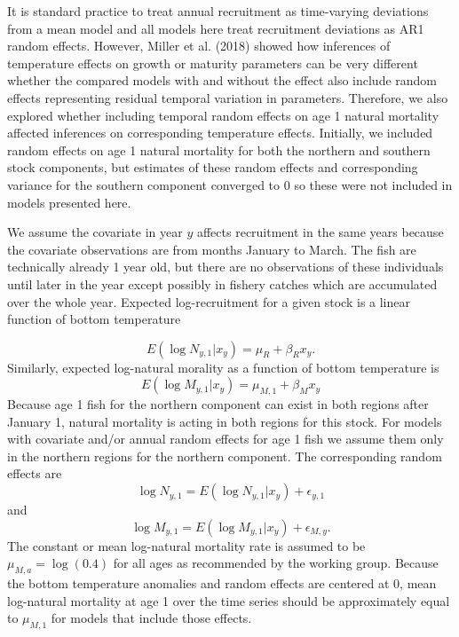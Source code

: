 \documentclass[
]{article}
\begin{document}
It is standard practice to treat annual recruitment as time-varying
deviations from a mean model and all models here treat recruitment
deviations as AR1 random effects. However, Miller et al. (2018) showed
how inferences of temperature effects on growth or maturity parameters
can be very different whether the compared models with and without the
effect also include random effects representing residual temporal
variation in parameters. Therefore, we also explored whether including
temporal random effects on age 1 natural mortality affected inferences
on corresponding temperature effects. Initially, we included random
effects on age 1 natural mortality for both the northern and southern
stock components, but estimates of these random effects and
corresponding variance for the southern component converged to 0 so
these were not included in models presented here.

We assume the covariate in year \(y\) affects recruitment in the same
years because the covariate observations are from months January to
March. The fish are technically already 1 year old, but there are no
observations of these individuals until later in the year except
possibly in fishery catches which are accumulated over the whole year.
Expected log-recruitment for a given stock is a linear function of
bottom temperature

\begin{equation}\label{eq:expected-recruitment}
E\left(\log N_{y,1}|x_y\right) = \mu_{R} + \beta_{R} x_y.
\end{equation} Similarly, expected log-natural morality as a function of
bottom temperature is \begin{equation}\label{eq:expected-M1}
E\left(\log M_{y,1}|x_y\right) = \mu_{M,1} + \beta_{M} x_y
\end{equation} Because age 1 fish for the northern component can exist
in both regions after January 1, natural mortality is acting in both
regions for this stock. For models with covariate and/or annual random
effects for age 1 fish we assume them only in the northern regions for
the northern component. The corresponding random effects are
\begin{equation}\label{eq:Rec-re}
\log N_{y,1} = E\left(\log N_{y,1}|x_y\right) + \epsilon_{y,1}
\end{equation} and \begin{equation}\label{eq:M-re}
\log M_{y,1} = E\left(\log M_{y,1}|x_y\right) + \epsilon_{M,y}.
\end{equation} The constant or mean log-natural mortality rate is
assumed to be \(\mu_{M,a} = \log(0.4)\) for all ages as recommended by
the working group. Because the bottom temperature anomalies and random
effects are centered at 0, mean log-natural mortality at age 1 over the
time series should be approximately equal to \(\mu_{M,1}\) for models
that include those effects.
\end{document}
